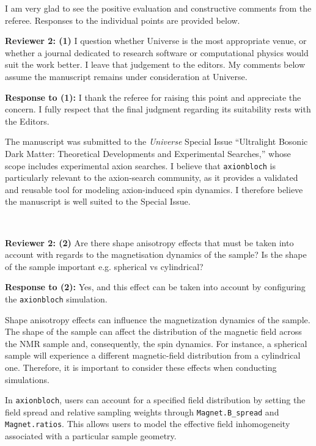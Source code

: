\documentclass{article}
\providecommand{\DIFdeltex}[1]{{\protect\color{red}\sout{#1}}}                      %
\providecommand{\DIFaddbegin}{} %
\providecommand{\DIFaddend}{} %
\providecommand{\DIFdelbegin}{} %
\providecommand{\DIFdelend}{} %
\providecommand{\DIFdel}[1]{\texorpdfstring{\DIFdeltex{#1}}{}} %
\newcommand{\difDelContent}[1]{
  \DIFdelbegin \DIFdel{#1}\DIFdelend 
}
\newcommand{\difAddContent}[1]{
  \DIFaddbegin
  \begingroup\color{blue}#1\endgroup
  \DIFaddend
}
\newcommand{\refereeNoTwoBox}[2]{
  \begin{mdframed}[linecolor=black]
  \noindent \textbf{Reviewer 2: (#1)} #2
  \end{mdframed}
}
\newcommand{\mdframedBox}[1]{
  \begin{mdframed}[linecolor=blue,topline=false,bottomline=false]
  \noindent #1
  \end{mdframed}
}
\newcommand{\response}[2]{
  \noindent \textbf{Response to (#1):} #2
}
\begin{document}
I am very glad to see the positive evaluation and constructive comments from the referee. 
Responses to the individual points are provided below. 


\refereeNoTwoBox{1}{
    I question whether Universe is the most appropriate venue, or whether a journal dedicated to research software or computational physics would suit the work better. I leave that judgement to the editors. My comments below assume the manuscript remains under consideration at Universe.
}

\response{1}{
I thank the referee for raising this point and appreciate the concern.
I fully respect that the final judgment regarding its suitability rests with the Editors. 

The manuscript was submitted to the \textit{Universe} Special Issue ``Ultralight Bosonic Dark Matter: Theoretical Developments and Experimental Searches,'' whose scope includes experimental axion searches. 
I believe that \texttt{axionbloch} is particularly relevant to the axion-search community, as it provides a validated and reusable tool for modeling axion-induced spin dynamics. 
I therefore believe the manuscript is well suited to the Special Issue. }





~\
~\

\refereeNoTwoBox{2}{
    Are there shape anisotropy effects that must be taken into account with regards to the magnetisation dynamics of the sample? Is the shape of the sample important e.g. spherical vs cylindrical?
}

\response{2}{
Yes, and this effect can be taken into account by configuring the \texttt{axionbloch} simulation.

Shape anisotropy effects can influence the magnetization dynamics of the sample. 
The shape of the sample can affect the distribution of the magnetic field across the NMR sample and, consequently, the spin dynamics. 
For instance, a spherical sample will experience a different magnetic-field distribution from a cylindrical one. 
Therefore, it is important to consider these effects when conducting simulations.

In \texttt{axionbloch}, users can account for a specified field distribution by setting the field spread and relative sampling weights through \texttt{Magnet.B\_spread} and \texttt{Magnet.ratios}. 
This allows users to model the effective field inhomogeneity associated with a particular sample geometry.
} 
~\
~\
\end{document}
